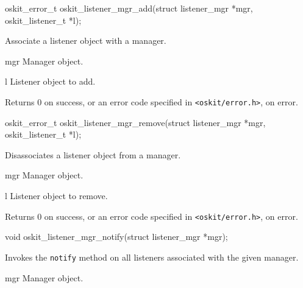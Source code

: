 \begin{apisyn}

	\funcproto oskit_error_t
	oskit_listener_mgr_add(struct listener_mgr *mgr, oskit_listener_t *l);
\end{apisyn}
\begin{apidesc}
	Associate a listener object with a manager.
\end{apidesc}
\begin{apiparm}
	\item[mgr]
		Manager object.
	\item[l]
		Listener object to add.
\end{apiparm}
\begin{apiret}
	Returns 0 on success, or an error code specified in
	{\tt <oskit/error.h>}, on error.
\end{apiret}

\begin{apisyn}

	\funcproto oskit_error_t
	oskit_listener_mgr_remove(struct listener_mgr *mgr,
				  oskit_listener_t *l);
\end{apisyn}
\begin{apidesc}
	Disassociates a listener object from a manager.
\end{apidesc}
\begin{apiparm}
	\item[mgr]
		Manager object.
	\item[l]
		Listener object to remove.
\end{apiparm}
\begin{apiret}
	Returns 0 on success, or an error code specified in
	{\tt <oskit/error.h>}, on error.
\end{apiret}

\begin{apisyn}

	\funcproto void
	oskit_listener_mgr_notify(struct listener_mgr *mgr);
\end{apisyn}
\begin{apidesc}
	Invokes the \texttt{notify} method on all listeners associated
	with the given manager.
\end{apidesc}
\begin{apiparm}
	\item[mgr]
		Manager object.
\end{apiparm}

